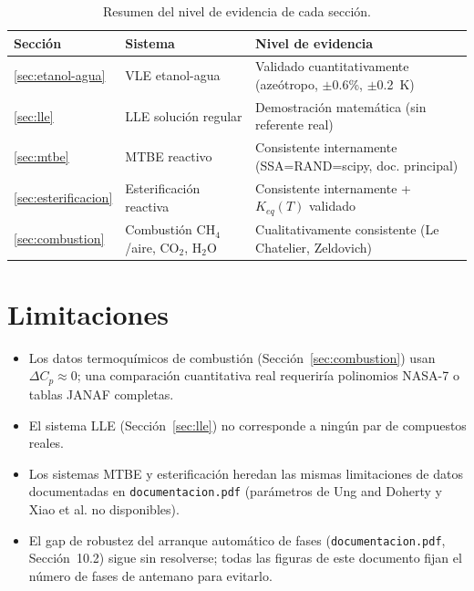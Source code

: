 \documentclass[11pt,a4paper]{article}
\begin{document}
\begin{table}[h]
\centering
\caption{Resumen del nivel de evidencia de cada sección.}
\begin{tabular}{@{}lll@{}}
\toprule
Sección & Sistema & Nivel de evidencia \\
\midrule
\ref{sec:etanol-agua} & VLE etanol-agua & Validado cuantitativamente (azeótropo, $\pm$0.6\%, $\pm$0.2~K) \\
\ref{sec:lle} & LLE solución regular & Demostración matemática (sin referente real) \\
\ref{sec:mtbe} & MTBE reactivo & Consistente internamente (SSA=RAND=scipy, doc. principal) \\
\ref{sec:esterificacion} & Esterificación reactiva & Consistente internamente + $K_{eq}(T)$ validado \\
\ref{sec:combustion} & Combustión CH$_4$/aire, CO$_2$, H$_2$O & Cualitativamente consistente (Le Chatelier, Zeldovich) \\
\bottomrule
\end{tabular}
\end{table}

\section{Limitaciones}

\begin{itemize}
  \item Los datos termoquímicos de combustión (Sección~\ref{sec:combustion})
    usan $\Delta C_p \approx 0$; una comparación cuantitativa real
    requeriría polinomios NASA-7 o tablas JANAF completas.
  \item El sistema LLE (Sección~\ref{sec:lle}) no corresponde a ningún
    par de compuestos reales.
  \item Los sistemas MTBE y esterificación heredan las mismas
    limitaciones de datos documentadas en \texttt{documentacion.pdf}
    (parámetros de Ung and Doherty y Xiao et al. no disponibles).
  \item El gap de robustez del arranque automático de fases
    (\texttt{documentacion.pdf}, Sección~10.2) sigue sin resolverse;
    todas las figuras de este documento fijan el número de fases de
    antemano para evitarlo.
\end{itemize}

\end{document}
